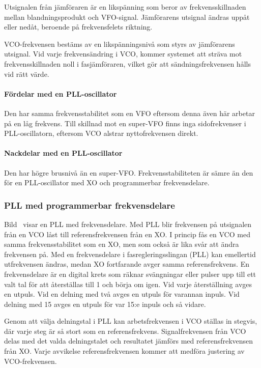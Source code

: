 Utsignalen från jämföraren är en likspänning som beror av frekvensskillnaden
mellan blandningsprodukt och VFO-signal.
Jämförarens utsignal ändras uppåt eller nedåt, beroende på frekvensfelets
riktning.

VCO-frekvensen bestäms av en likspänningsnivå som styrs av jämförarens
utsignal.
Vid varje frekvensändring i VCO, kommer systemet att sträva mot
frekvensskillnaden noll i fasjämföraren, vilket gör att sändningsfrekvensen
hålls vid rätt värde.

\paragraph{Fördelar med en PLL-oscillator}
Den har samma frekvensstabilitet som en VFO eftersom denna även här arbetar på
en låg frekvens.
Till skillnad mot en super-VFO finns inga sidofrekvenser i PLL-oscillatorn,
eftersom VCO alstrar nyttofrekvensen direkt.

\paragraph{Nackdelar med en PLL-oscillator}
Den har högre brusnivå än en super-VFO.
Frekvensstabiliteten är sämre än den för en PLL-oscillator med XO och
programmerbar frekvensdelare.

\subsubsection{PLL med programmerbar frekvensdelare}


Bild~ visar en PLL med frekvensdelare.
Med PLL blir frekvensen på utsignalen från en VCO låst till referensfrekvensen
från en XO.
I princip fås en VCO med samma frekvensstabilitet som en XO, men som också är
lika svår att ändra frekvensen på.
Med en frekvensdelare i fasregleringsslingan (PLL) kan emellertid utfrekvensen
ändras, medan XO fortfarande avger samma referensfrekvens.
En frekvensdelare är en digital krets som räknar svängningar eller pulser upp
till ett valt tal för att återställas till 1 och börja om igen.
Vid varje återställning avges en utpuls.
Vid en delning med två avges en utpuls för varannan inpuls.
Vid delning med 15 avges en utpuls för var 15:e inpuls och så vidare.

Genom att välja delningstal i PLL kan arbetsfrekvensen i VCO ställas
in stegvis, där varje steg är så stort som en referensfrekvens.
Signalfrekvensen från VCO delas med det valda delningstalet och resultatet
jämförs med referensfrekvensen från XO.
Varje avvikelse referensfrekvensen kommer att medföra justering av
VCO-frekvensen.

